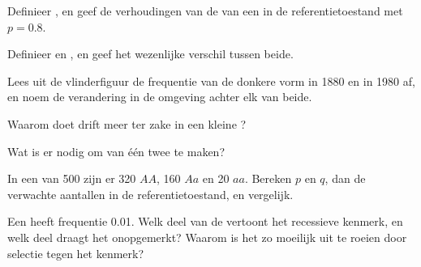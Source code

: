 \begin{exercise}[$\star$]\label{exo:g12:selection-drift-speciation:1}
Definieer , en geef de verhoudingen van de  van
een  in de referentietoestand met $p = 0.8$.
\end{exercise}

\begin{exercise}[$\star$]\label{exo:g12:selection-drift-speciation:2}
Definieer  en , en geef het wezenlijke
verschil tussen beide.
\end{exercise}

\begin{exercise}[$\star$]\label{exo:g12:selection-drift-speciation:3}
Lees uit de vlinderfiguur de frequentie van de donkere vorm in 1880 en in
1980 af, en noem de verandering in de omgeving achter elk van beide.
\end{exercise}

\begin{exercise}[$\star$]\label{exo:g12:selection-drift-speciation:4}
Waarom doet drift meer ter zake in een kleine ?
\end{exercise}

\begin{exercise}[$\star$]\label{exo:g12:selection-drift-speciation:5}
Wat is er nodig om van één  twee  te maken?
\end{exercise}

\begin{exercise}[$\star\star$]\label{exo:g12:selection-drift-speciation:6}
In een  van 500 zijn er 320 $AA$, 160 $Aa$ en 20 $aa$. Bereken
$p$ en $q$, dan de verwachte aantallen  in de
referentietoestand, en vergelijk.
\end{exercise}

\begin{exercise}[$\star\star$]\label{exo:g12:selection-drift-speciation:7}
Een   heeft frequentie 0.01. Welk deel van de 
vertoont het recessieve kenmerk, en welk deel draagt het 
onopgemerkt? Waarom is het  zo moeilijk uit te roeien door selectie
tegen het kenmerk?
\end{exercise}

